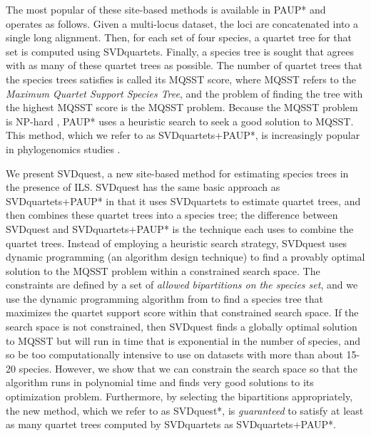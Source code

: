 The most popular of these site-based methods is available in PAUP*
\cite{paup}
and operates as follows.  
Given a multi-locus dataset,  the loci are concatenated into a single long alignment.
Then, for each set of four species, a quartet tree for that set
is computed  using  SVDquartets.
Finally, a species tree is sought that agrees with as many of these
quartet trees as possible.
{The number of quartet trees that the species trees satisfies is called its MQSST score, where MQSST refers to the {\em Maximum Quartet Support
  Species Tree}, and
  the problem of finding the tree with the highest MQSST score is the MQSST problem.
  Because the MQSST problem } is NP-hard
\cite{jiang2001polynomial}, PAUP* uses a heuristic search  
to
seek a good solution to MQSST.  
This method,   which we refer to
as SVDquartets+PAUP*,  is increasingly popular in
phylogenomics studies
\cite{leache2015phylogenomics,campillo2016use,manthey2016comparison,white2016multi,leavitt2016resolving,crowl2017embracing,he2016talpid,hosner2016rapid,manthey2017relationships,moyle2016tectonic,boucher2016sequence,hime2016influence,Mitchell01012017,alexander2017genomic,de2017phylogenomics,anderson2017genotyping,white2017ultraconserved}.



We present SVDquest, a new site-based method 
for estimating species trees in the presence of ILS.
SVDquest has the same basic approach as
SVDquartets+PAUP* in that it uses
SVDquartets to estimate quartet trees,
and then combines these quartet
trees into a species tree; the difference between
SVDquest and SVDquartets+PAUP* is
the technique each uses to combine the quartet trees.
Instead of employing a heuristic search strategy,
SVDquest uses dynamic programming (an algorithm
design technique) to find a provably optimal
solution to the MQSST 
problem within a constrained search space. 
The constraints are defined by a set of {\em allowed bipartitions on
  the species set}, and we use the dynamic programming algorithm from \cite{bryant2001constructing} to find a species tree that maximizes
the quartet support score within that constrained search space.
If the search space is not constrained, then SVDquest
finds a globally optimal solution to MQSST but will run in time that is exponential in the number of species, and so be too computationally intensive to use on datasets with more than about 15-20 species. 
However, we show that we can constrain the search
space so that the algorithm runs in polynomial time and
finds very good solutions to its optimization problem.
 Furthermore, by
selecting the bipartitions appropriately, the new method, which we
refer to as SVDquest*, is {\em guaranteed} to satisfy at least as many
quartet trees computed by SVDquartets as SVDquartets+PAUP*.



